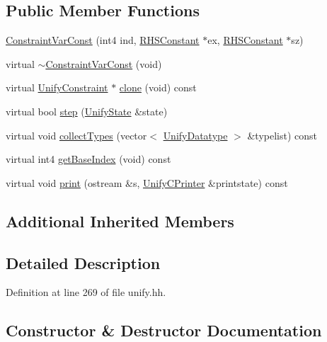 \subsection*{Public Member Functions}
\begin{DoxyCompactItemize}
\item 
\mbox{\hyperlink{class_constraint_var_const_a247c485aa2be30d776dab2ccd8cea8d2}{Constraint\+Var\+Const}} (int4 ind, \mbox{\hyperlink{class_r_h_s_constant}{R\+H\+S\+Constant}} $\ast$ex, \mbox{\hyperlink{class_r_h_s_constant}{R\+H\+S\+Constant}} $\ast$sz)
\item 
virtual \mbox{\hyperlink{class_constraint_var_const_a0f136de462b3babc2b41645cbeed8ee8}{$\sim$\+Constraint\+Var\+Const}} (void)
\item 
virtual \mbox{\hyperlink{class_unify_constraint}{Unify\+Constraint}} $\ast$ \mbox{\hyperlink{class_constraint_var_const_a5cb644447fed3576d92e25d3349eb387}{clone}} (void) const
\item 
virtual bool \mbox{\hyperlink{class_constraint_var_const_a2c4e5c53f16ad3a76ab6c54c850b3d5b}{step}} (\mbox{\hyperlink{class_unify_state}{Unify\+State}} \&state)
\item 
virtual void \mbox{\hyperlink{class_constraint_var_const_afd6f18a2472dfb5dd484b03505a4ebd6}{collect\+Types}} (vector$<$ \mbox{\hyperlink{class_unify_datatype}{Unify\+Datatype}} $>$ \&typelist) const
\item 
virtual int4 \mbox{\hyperlink{class_constraint_var_const_a8441e950b8d30d061a00db75c03c5e35}{get\+Base\+Index}} (void) const
\item 
virtual void \mbox{\hyperlink{class_constraint_var_const_a4408cf7f3c133b79f24ba36285069c4a}{print}} (ostream \&s, \mbox{\hyperlink{class_unify_c_printer}{Unify\+C\+Printer}} \&printstate) const
\end{DoxyCompactItemize}
\subsection*{Additional Inherited Members}


\subsection{Detailed Description}


Definition at line 269 of file unify.\+hh.



\subsection{Constructor \& Destructor Documentation}
\mbox{\label{class_constraint_var_const_a247c485aa2be30d776dab2ccd8cea8d2}} 
